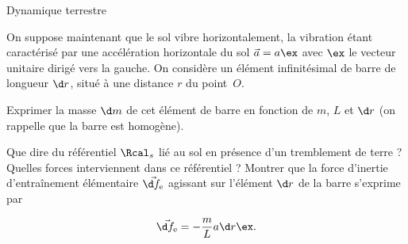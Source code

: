 \begin{exo}[PC][1][devoir]{Dynamique terrestre}
\begin{quest}



\end{quest}

On suppose maintenant que le sol vibre horizontalement, la vibration étant caractérisé par une accélération horizontale du sol $\Vec{a} = a \ex$ avec $\ex$ le vecteur  unitaire dirigé vers la gauche. On considère un élément infinitésimal de barre de longueur $\d r$, situé à une distance $r$ du point~$O$.
\begin{quest}
\item Exprimer la masse $\d m$ de cet élément de barre en fonction  de $m$, $L$ et $\d r$ (on rappelle que la barre est homogène).


\item Que dire du référentiel $\Rcal_s$ lié au sol en présence d'un tremblement de terre ? Quelles forces interviennent dans ce référentiel ? Montrer que la force d'inertie d'entraînement élémentaire $\Vec{\d f_{\rm e}}$ agissant sur l'élément $\d r$ de la barre s'exprime par

\begin{equation}
  \Vec{\d f_{\rm e}} = - \frac{m}{L} a   \d r  \ex.
\end{equation}


\end{quest}
\end{exo}
